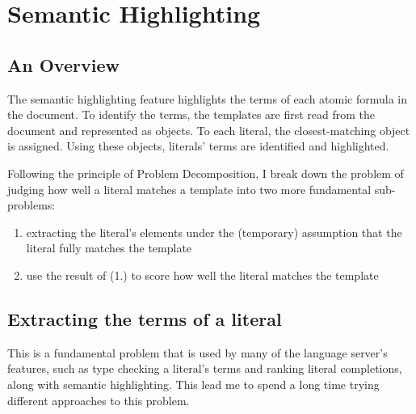 \documentclass[../main.tex]{subfiles}
\begin{document}
%
%
%
\section{Semantic Highlighting}
\subsection{An Overview}
The semantic highlighting feature highlights the terms of each atomic formula in the document. To identify the terms, the templates are first read from the document and represented as  objects. To each literal, the closest-matching  object is assigned. Using these  objects, literals' terms are identified and highlighted.



Following the principle of Problem Decomposition, I break down the problem of judging how well a literal matches a template into two more fundamental sub-problems:
\begin{enumerate}
    \item extracting the literal's elements under the (temporary) assumption that the literal fully matches the template
    \item use the result of (1.) to score how well the literal matches the template
\end{enumerate}

\subsection{Extracting the terms of a literal}
This is a fundamental problem that is used by many of the language server's features, such as type checking a literal's terms and ranking literal completions, along with semantic highlighting. This lead me to spend a long time trying different approaches to this problem.
\end{document}
